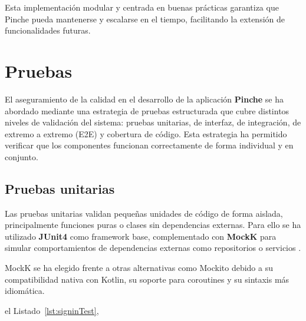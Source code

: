 Esta implementación modular y centrada en buenas prácticas garantiza que Pinche pueda mantenerse y escalarse en el tiempo, facilitando la extensi\'on de funcionalidades futuras.

\section{Pruebas}
\label{sec:pruebas}

El aseguramiento de la calidad en el desarrollo de la aplicación \textbf{Pinche} se ha abordado mediante una estrategia de pruebas estructurada que cubre distintos niveles de validación del sistema: pruebas unitarias, de interfaz, de integración, de extremo a extremo (E2E) y cobertura de código. Esta estrategia ha permitido verificar que los componentes funcionan correctamente de forma individual y en conjunto.

\subsection{Pruebas unitarias}

Las pruebas unitarias validan pequeñas unidades de código de forma aislada, principalmente funciones puras o clases sin dependencias externas. Para ello se ha utilizado \textbf{JUnit4} como framework base, complementado con \textbf{MockK} para simular comportamientos de dependencias externas como repositorios o servicios \cite{android-testing}.

MockK se ha elegido frente a otras alternativas como Mockito debido a su compatibilidad nativa con Kotlin, su soporte para coroutines y su sintaxis más idiomática.

el Listado~\ref{lst:signinTest},

